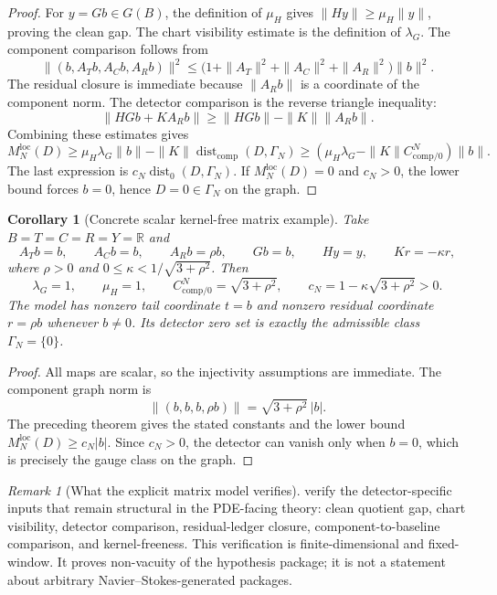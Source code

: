 \documentclass[11pt]{article}
\numberwithin{equation}{section}
\newtheorem{corollary}[corollary]{Corollary}
\theoremstyle{definition}
\theoremstyle{remark}
\newtheorem{remark}[remark]{Remark}
\newcommand{\loc}{\mathrm{loc}}
\newcommand{\comp}{\mathrm{comp}}
\newcommand{\Dist}{\operatorname{dist}}
\begin{document}
\begin{proof}
For \(y=Gb\in G(B)\), the definition of \(\mu_H\) gives \(\|Hy\|\ge \mu_H\|y\|\), proving the clean gap.  The chart visibility estimate is the definition of \(\lambda_G\).  The component comparison follows from
\[
        \|(b,A_Tb,A_Cb,A_Rb)\|^2
        \le
        \bigl(1+\|A_T\|^2+\|A_C\|^2+\|A_R\|^2\bigr)\|b\|^2.
\]
The residual closure is immediate because \(\|A_Rb\|\) is a coordinate of the component norm.  The detector comparison is the reverse triangle inequality:
\[
        \|HGb+KA_Rb\|
        \ge
        \|HGb\|-\|K\|\|A_Rb\|.
\]
Combining these estimates gives
\[
        M_N^{\loc}(D)
        \ge
        \mu_H\lambda_G\|b\|-\|K\|\Dist_{\comp}(D,\Gamma_N)
        \ge
        (\mu_H\lambda_G-\|K\|C_{\comp/0}^{N})\|b\|.
\]
The last expression is \(c_N\Dist_0(D,\Gamma_N)\).  If \(M_N^{\loc}(D)=0\) and \(c_N>0\), the lower bound forces \(b=0\), hence \(D=0\in\Gamma_N\) on the graph.
\end{proof}

\begin{corollary}[Concrete scalar kernel-free matrix example]\label{cor:concrete-kernel-free-matrix-example}
Take \(B=T=C=R=Y=\mathbb R\) and
\[
        A_Tb=b,
        \qquad
        A_Cb=b,
        \qquad
        A_Rb=\rho b,
        \qquad
        Gb=b,
        \qquad
        Hy=y,
        \qquad
        Kr=-\kappa r,
\]
where \(\rho>0\) and \(0\le \kappa<1/\sqrt{3+\rho^2}\).  Then
\[
        \lambda_G=1,
        \qquad
        \mu_H=1,
        \qquad
        C_{\comp/0}^{N}=\sqrt{3+\rho^2},
        \qquad
        c_N=1-\kappa\sqrt{3+\rho^2}>0.
\]
The model has nonzero tail coordinate \(t=b\) and nonzero residual coordinate \(r=\rho b\) whenever \(b\ne0\).  Its detector zero set is exactly the admissible class \(\Gamma_N=\{0\}\).
\end{corollary}

\begin{proof}
All maps are scalar, so the injectivity assumptions are immediate.  The component graph norm is
\[
        \|(b,b,b,\rho b)\|=\sqrt{3+\rho^2}\,|b|.
\]
The preceding theorem gives the stated constants and the lower bound \(M_N^{\loc}(D)\ge c_N|b|\).  Since \(c_N>0\), the detector can vanish only when \(b=0\), which is precisely the gauge class on the graph.
\end{proof}

\begin{remark}[What the explicit matrix model verifies]
 verify the detector-specific inputs that remain structural in the PDE-facing theory: clean quotient gap, chart visibility, detector comparison, residual-ledger closure, component-to-baseline comparison, and kernel-freeness.  This verification is finite-dimensional and fixed-window.  It proves non-vacuity of the hypothesis package; it is not a statement about arbitrary Navier--Stokes-generated packages.
\end{remark}
\end{document}
